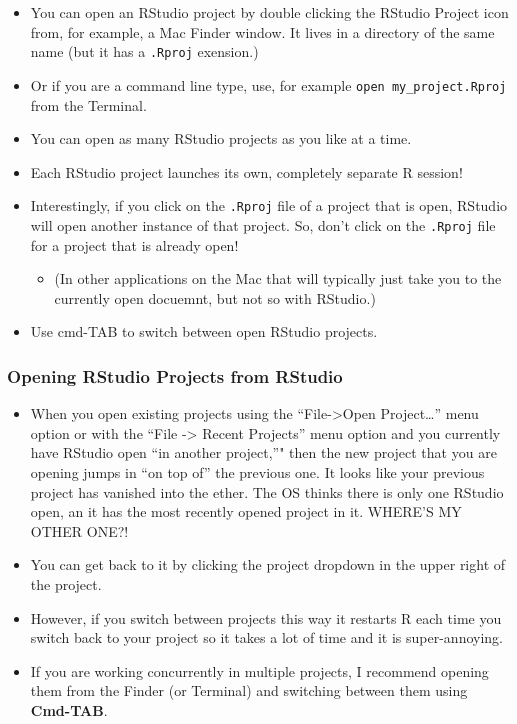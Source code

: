 \documentclass[]{book}
\providecommand{\tightlist}{%
  \setlength{\itemsep}{0pt}\setlength{\parskip}{0pt}}
\theoremstyle{definition}
\theoremstyle{definition}
\theoremstyle{remark}
\begin{document}
\begin{itemize}
\tightlist
\item
  You can open an RStudio project by double clicking the RStudio Project
  icon from, for example, a Mac Finder window. It lives in a directory
  of the same name (but it has a \texttt{.Rproj} exension.)
\item
  Or if you are a command line type, use, for example
  \texttt{open\ my\_project.Rproj} from the Terminal.
\item
  You can open as many RStudio projects as you like at a time.
\item
  Each RStudio project launches its own, completely separate R session!
\item
  Interestingly, if you click on the \texttt{.Rproj} file of a project
  that is open, RStudio will open another instance of that project. So,
  don't click on the \texttt{.Rproj} file for a project that is already
  open!

  \begin{itemize}
  \tightlist
  \item
    (In other applications on the Mac that will typically just take you
    to the currently open docuemnt, but not so with RStudio.)
  \end{itemize}
\item
  Use cmd-TAB to switch between open RStudio projects.
\end{itemize}

\subsubsection{Opening RStudio Projects from
RStudio}\label{opening-rstudio-projects-from-rstudio}

\begin{itemize}
\tightlist
\item
  When you open existing projects using the ``File-\textgreater{}Open
  Project\ldots{}'' menu option or with the ``File -\textgreater{}
  Recent Projects'' menu option and you currently have RStudio open ``in
  another project,''" then the new project that you are opening jumps in
  ``on top of'' the previous one. It looks like your previous project
  has vanished into the ether. The OS thinks there is only one RStudio
  open, an it has the most recently opened project in it. WHERE'S MY
  OTHER ONE?!
\item
  You can get back to it by clicking the project dropdown in the upper
  right of the project.
\item
  However, if you switch between projects this way it restarts R each
  time you switch back to your project so it takes a lot of time and it
  is super-annoying.
\item
  If you are working concurrently in multiple projects, I recommend
  opening them from the Finder (or Terminal) and switching between them
  using \textbf{Cmd-TAB}.
\end{itemize}
\end{document}
